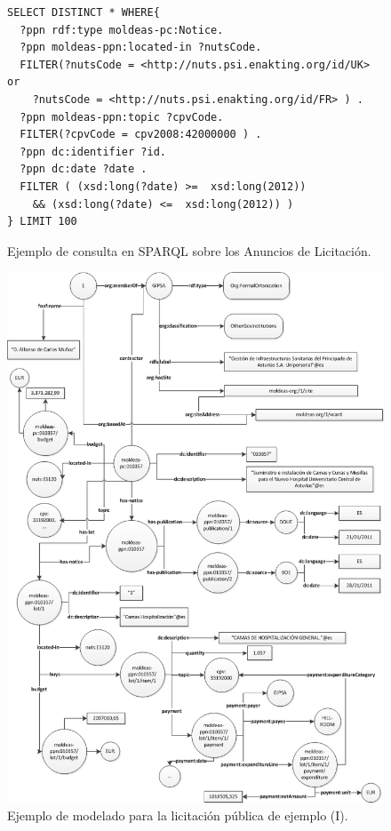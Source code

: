 % 
\begin{figure}[!htp]
\begin{lstlisting} 
SELECT DISTINCT * WHERE{
  ?ppn rdf:type moldeas-pc:Notice.
  ?ppn moldeas-ppn:located-in ?nutsCode.
  FILTER(?nutsCode = <http://nuts.psi.enakting.org/id/UK> or 
    ?nutsCode = <http://nuts.psi.enakting.org/id/FR> ) .
  ?ppn moldeas-ppn:topic ?cpvCode. 
  FILTER(?cpvCode = cpv2008:42000000 ) .
  ?ppn dc:identifier ?id.
  ?ppn dc:date ?date . 
  FILTER ( (xsd:long(?date) >=  xsd:long(2012)) 
    && (xsd:long(?date) <=  xsd:long(2012)) )
} LIMIT 100
\end{lstlisting}
	\caption{Ejemplo de consulta en SPARQL sobre los Anuncios de Licitación.}
	\label{fig:ppng-sparql-query}
\end{figure}
% 
% 
\begin{figure}[!htp]
    \centering
	\includegraphics[width=16cm]{images/phd/modelo/hospital-1}
	\caption{Ejemplo de modelado para la licitación pública de ejemplo (I).}
	\label{fig:modelo-hospital-1}
\end{figure}

